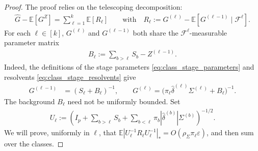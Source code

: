\documentclass[EJP, preprint, NODS, nobera, nofontexpansion]{ejpecp}
\begin{document}
\begin{proof}
The proof relies on the telescoping decomposition:
\begin{align}\label{eq:def_Rr}
    \widehat G - \mathbb E[G^Z]
    = \sum_{\ell=1}^k \mathbb{E}[R_{\ell}]
    \qquad \text{with}\quad 
   R_{\ell} := G^{(\ell)}-\mathbb E[G^{(\ell-1)}\mid\mathcal F^{\ell}].
\end{align}
For each $\ell\in[k]$, $G^{(\ell)}$ and $G^{(\ell-1)}$ both share the $\mathcal F^{\ell}$-measurable parameter matrix
\begin{align*}
    B_{\ell}:=\sum_{b>\ell}S_b-Z^{(\ell-1)}.
\end{align*}
Indeed, the definitions of the
stage parameters \eqref{eq:class_stage_parameters} and
resolvents \eqref{eq:class_stage_resolvents} give\begin{align}
    G^{(\ell-1)}&=(S_{\ell}+B_{\ell})^{-1},
    \qquad 
    G^{(\ell)}
    =\bigl(\pi_{\ell}\widehat\delta^{(\ell)}\Sigma^{(\ell)}+B_{\ell}\bigr)^{-1}.
\end{align}
    The background $B_{\ell}$ need not be uniformly bounded. Set
\begin{align*}
    U_{\ell}:=\left(
        I_p+\sum_{b>\ell}S_b
        +\sum_{b<\ell}\pi_b|\widehat\delta^{(b)}|\Sigma^{(b)}
    \right)^{-1/2}.
\end{align*}
We will prove, uniformly in $\ell$, that
$\mathbb E\left\vert U_{\ell}^{-1}R_{\ell}U_{\ell}^{-1}\right\vert_*
    =O\!\left(\rho_\Sigma\pi_{\ell}\varepsilon\right)$,
and then sum over the classes.


\end{proof}
\end{document}
